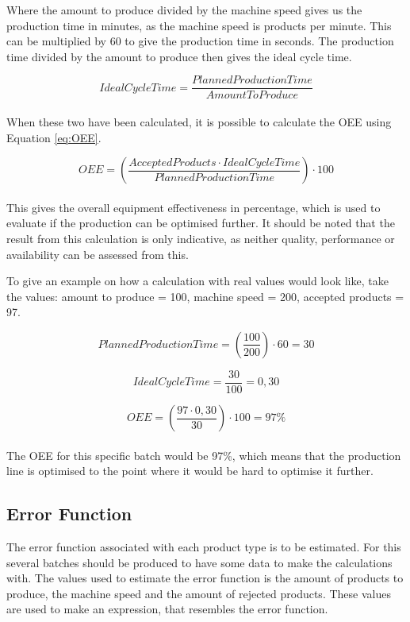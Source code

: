 Where the amount to produce divided by the machine speed gives us the production
time in minutes, as the machine speed is products per minute. This can be
multiplied by 60 to give the production time in seconds. The production time
divided by the amount to produce then gives the ideal cycle time.

\[IdealCycleTime = \frac{PlannedProductionTime}{AmountToProduce}\]\\

When these two have been calculated, it is possible to calculate the OEE using
Equation \ref{eq:OEE}.

\[OEE = \left(\frac{AcceptedProducts\cdot{IdealCycleTime}}{PlannedProductionTime}\right)\cdot100\]\\

This gives the overall equipment effectiveness in percentage, which is used to
evaluate if the production can be optimised further. It should be noted that
the result from this calculation is only indicative, as neither quality,
performance or availability can be assessed from this.

To give an example on how a calculation with real values would look like, take
the values: amount to produce = 100, machine speed = 200, accepted products = 97.

\[PlannedProductionTime = \left(\frac{100}{200}\right)\cdot60 = 30\]

\[IdealCycleTime = \frac{30}{100}=0,30\]

\[OEE = \left(\frac{97\cdot0,30}{30}\right)\cdot100 = 97\%\]\\

The OEE for this specific batch would be 97\%, which means that the production
line is optimised to the point where it would be hard to optimise it further.

\subsection{Error Function}
The error function associated with each product type is to be estimated. For
this several batches should be produced to have some data to make the
calculations with. The values used to estimate the error function is the amount
of products to produce, the machine speed and the amount of rejected products.
These values are used to make an expression, that resembles the error function. 

